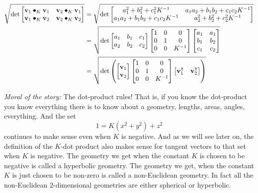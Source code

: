\documentclass[newpage,hints,handout]{ximera}
\begin{document}
\begin{problem}
\begin{freeResponse}
\begin{align*}
\sqrt{\det
\begin{bmatrix}
\mathbf{v}_{1}\bullet_{K}\mathbf{v}_{1} & \mathbf{v}_{2}\bullet_{K}\mathbf{v}_{1}\\
\mathbf{v}_{1}\bullet_{K}\mathbf{v}_{2} & \mathbf{v}_{2}\bullet_{K}\mathbf{v}_{2}%
\end{bmatrix}}
&=\sqrt{\det
\begin{bmatrix}
a^2_1 + b^2_1 + c^2_1K^{-1} & a_1a_2 + b_1b_2 + c_1c_2K^{-1}\\
a_1a_2 + b_1b_2 + c_1c_2K^{-1} & a^2_2 + b^2_2 + c^2_2K^{-1}%
\end{bmatrix}} \\
&= \sqrt{\det
\begin{bmatrix}
a_{1} & b_{1} & c_{1}\\
a_{2} & b_{2} & c_{2}
\end{bmatrix}
\begin{bmatrix}
1 & 0 & 0\\
0 & 1 & 0\\
0 & 0 & K^{-1}
\end{bmatrix}
\begin{bmatrix}
a_{1} & a_{1}  \\
b_{1} & b_{2}  \\
c_{1} &  c_{2}
\end{bmatrix}} \\
&= \sqrt{\det\left( 
\begin{bmatrix}
\mathbf{v}_{1} \\
\mathbf{v}_{2}
\end{bmatrix}
\begin{bmatrix}
1 & 0 & 0\\
0 & 1 & 0\\
0 & 0 & K^{-1}%
\end{bmatrix}
\begin{bmatrix}
\mathbf{v}_{1}^\transpose & \mathbf{v}_{2}^\transpose%
\end{bmatrix}
\right) }
\end{align*}
\end{freeResponse}

\end{problem}

\textit{Moral of the story:} The dot-product rules! That is, if you
know the dot-product you know everything there is to know about a
geometry, lengths, areas, angles, everything. And the set
\[
1=K\left(x^{2}+y^{2}\right)+z^{2} 
\]
continues to make sense even when $K$ is
negative. And as we will see later on, the definition of the $K$-dot
product also makes sense for tangent vectors to that set when $K$ is
negative. The geometry we get when the constant $K$ is chosen to be
negative is called a hyperbolic geometry. The geometry we get, when
the constant $K$ is just chosen to be non-zero is called a
non-Euclidean geometry.  In fact all the non-Euclidean $2$-dimensional
geometries are either spherical or hyperbolic.
\end{document}
